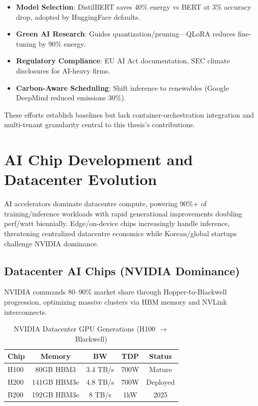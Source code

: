 \begin{itemize}
    \item \textbf{Model Selection}: DistilBERT saves 40\% energy vs BERT at 3\% accuracy drop, adopted by HuggingFace defaults.
    \item \textbf{Green AI Research}: Guides quantization/pruning—QLoRA reduces fine-tuning by 90\% energy.
    \item \textbf{Regulatory Compliance}: EU AI Act documentation, SEC climate disclosures for AI-heavy firms.
    \item \textbf{Carbon-Aware Scheduling}: Shift inference to renewables (Google DeepMind reduced emissions 30\%).
\end{itemize}

These efforts establish baselines but lack container-orchestration integration and multi-tenant granularity central to this thesis's contributions.\@

\section{AI Chip Development and Datacenter Evolution}

AI accelerators dominate datacentre compute, powering 90\%+ of training/inference workloads with rapid generational improvements doubling perf/watt biennially. Edge/on-device chips increasingly handle inference, threatening centralized datacentre economics while Korean/global startups challenge NVIDIA dominance.

\subsection{Datacenter AI Chips (NVIDIA Dominance)}

NVIDIA commands 80--90\% market share through Hopper-to-Blackwell progression, optimizing massive clusters via HBM memory and NVLink interconnects.

\begin{table}[htbp]
\centering
\small  %
\caption{NVIDIA Datacenter GPU Generations (H100 $\to$ Blackwell)}
\begin{tabular}{l c c c c}
\toprule
Chip & Memory & BW & TDP & Status \\
\midrule
H100 & 80GB HBM3 & 3.4 TB/s & 700W & Mature \\
H200 & 141GB HBM3e & 4.8 TB/s & 700W & Deployed \\
B200 & 192GB HBM3e & 8 TB/s & 1kW & 2025 \\
\bottomrule
\end{tabular}
\end{table}

